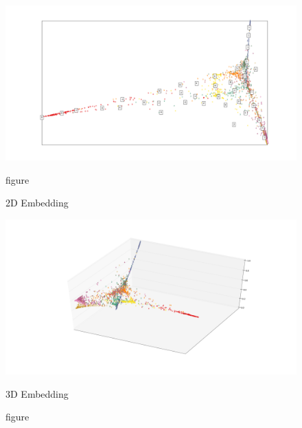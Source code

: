 \documentclass{article}
\begin{document}
	\begin{figure}[h]
		\centering
		\begin{minipage}{.45\textwidth}
			\centering
			\includegraphics[width=\linewidth]{imgs/2D_2000.png}
			\caption{figure}{2D Embedding}
		\end{minipage}
		\begin{minipage}{.45\textwidth}
			\centering
			\includegraphics[width=\linewidth]{imgs/3D_1_2000.png}
			\caption{figure}{3D Embedding}
		\end{minipage}
	\end{figure}
\end{document}
